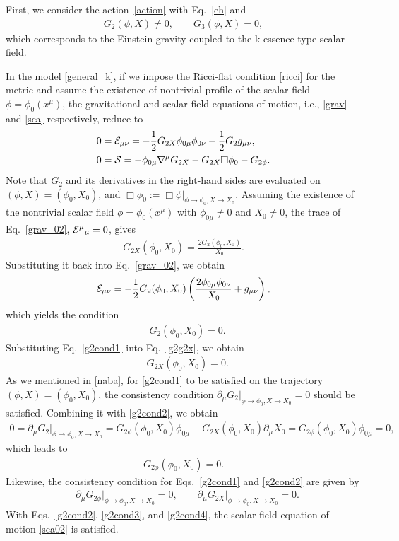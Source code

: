 \documentclass[prd,amsmath,amssymb,floatfix,superscriptaddress,notitlepage,nofootinbib,preprintnumbers]{revtex4-1}
\begin{document}
First, we consider the action~\eqref{action} with Eq.~\eqref{eh} and 
\begin{align}
\label{general_k}
G_2(\phi,X)\neq 0,
\qquad
G_3(\phi,X)=0,
\end{align}
which corresponds to
the Einstein gravity coupled to the k-essence type scalar field.


In the model \eqref{general_k},
if we impose the Ricci-flat condition \eqref{ricci} for the metric
and assume the existence of nontrivial profile of the scalar field $\phi=\phi_0(x^\mu)$,
the gravitational and scalar field equations of motion, i.e.,
\eqref{grav} and \eqref{sca} respectively,
reduce to 
\begin{align}
\label{grav_02}
0&={\cal E}_{\mu\nu}
=
-\frac{1}{2}G_{2X} \phi_{0\mu}\phi_{0\nu}
-\frac{1}{2} G_2 g_{\mu\nu},
\\
\label{sca02}
0&={\cal S}
=
-\phi_{0\mu} \nabla^\mu G_{2X}
-G_{2X} \Box \phi_{0}
-G_{2\phi}.
\end{align}
Note that $G_2$ and its derivatives in the right-hand sides are evaluated on $(\phi,X)=(\phi_0,X_0)$, and $\Box\phi_0:= \Box\phi|_{\phi\to \phi_0,X\to X_0}$.
Assuming the existence of the nontrivial scalar field $\phi=\phi_0(x^\mu)$
with $\phi_{0\mu}\neq 0$ and $X_0\neq 0$,
the trace of Eq.~\eqref{grav_02},
${\cal E}^\mu{}_\mu=0$,
gives
\begin{align}
\label{g2g2x}
G_{2X}(\phi_0,X_0)
=\frac{2G_2(\phi_0,X_0)}{X_0}.
\end{align}
Substituting it back into Eq.~\eqref{grav_02}, we obtain
\begin{align}
{\cal E}_{\mu\nu}
=-\frac{1}{2}G_2(\phi_0,X_0)
\left(
\frac{2\phi_{0\mu}\phi_{0\nu}}{X_0}
+g_{\mu\nu}
\right),
\end{align}
which yields the condition
\begin{align}
\label{g2cond1} 
&
G_2(\phi_0,X_0)=0.
\end{align}
Substituting Eq.~\eqref{g2cond1} into Eq.~\eqref{g2g2x}, we obtain
\begin{align}
\label{g2cond2}
&
G_{2X}(\phi_0,X_0)
=0.
\end{align}
As we mentioned in \eqref{naba}, for \eqref{g2cond1} to be satisfied on the trajectory $(\phi,X)=(\phi_0,X_0)$, 
the consistency condition $\partial_\mu G_2 |_{\phi\to \phi_0, X\to X_0}=0$ 
should be satisfied. Combining it with \eqref{g2cond2}, we obtain
\begin{align}
0=
\partial_\mu G_2
\Big|_{\phi\to \phi_0, X\to X_0}
=
G_{2\phi}(\phi_0,X_0)\phi_{0\mu}
+G_{2X} (\phi_0,X_0)\partial_\mu X_0
=G_{2\phi}(\phi_0,X_0)\phi_{0\mu}
=0,
\end{align}
which leads to 
\begin{align}
\label{g2cond3}
G_{2\phi}(\phi_0,X_0)=0.
\end{align}
Likewise, the consistency condition for Eqs.~\eqref{g2cond1} and \eqref{g2cond2} are given by 
\begin{align}
\label{g2cond4}
&\partial_\mu G_{2\phi}
\Big|_{\phi\to \phi_0,X\to X_0}=0, \qquad 
\partial_\mu G_{2X}
\Big|_{\phi\to \phi_0,X\to X_0}=0.
\end{align}
With Eqs.~\eqref{g2cond2}, \eqref{g2cond3}, and \eqref{g2cond4},
the scalar field equation of motion \eqref{sca02} is satisfied.
\end{document}
